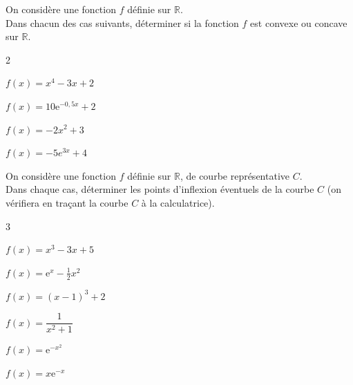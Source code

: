 \documentclass[11pt,a4paper]{article}  %
\begin{document}
\exerciceDS{}
On considère une fonction $f$ définie sur $\mathbb{R}$.\\
Dans chacun des cas suivants, déterminer si la fonction $f$ est convexe ou concave sur $\mathbb{R}$.

\begin{multicols}{2}
	\begin{enumMet}
	\item $f(x)=x^{4}-3 x+2$
	\item $f(x)=10 \mathrm{e}^{-0,5 x}+2$
	\item $f(x)=-2 x^{2}+3$
	\item $f(x)=-5 e^{3 x}+4$
\end{enumMet}
\end{multicols}

\exerciceDS{}
On considère une fonction $f$ définie sur $\mathbb{R}$, de courbe représentative $C$.\\
Dans chaque cas, déterminer les points d'inflexion éventuels de la courbe $C$ (on vérifiera en traçant la courbe $C$ à la calculatrice).

\begin{multicols}{3}
	\begin{enumMet}
	\item $f(x)=x^{3}-3 x+5$
	\item $f(x)=\mathrm{e}^{x}-\frac{1}{2} x^{2}$
	\item $f(x)=(x-1)^{3}+2$
	\item $f(x)=\dfrac{1}{x^{2}+1}$
	\item $f(x)=\mathrm{e}^{-x^{2}}$
	\item $f(x)=x \mathrm{e}^{-x}$
\end{enumMet}
\end{multicols}
\end{document}
